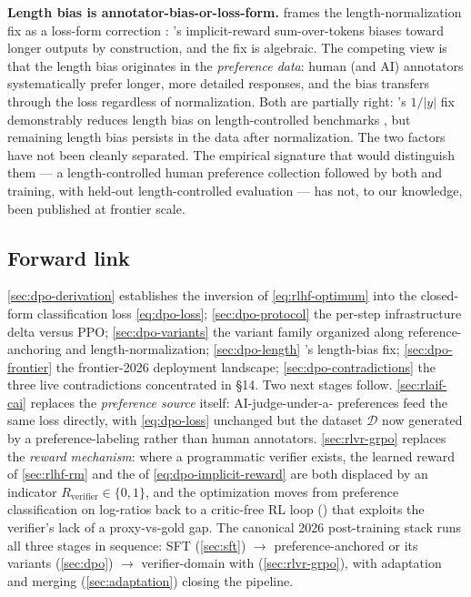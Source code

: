 \begin{contradiction}
\textbf{Length bias is annotator-bias-or-loss-form.}  frames the
length-normalization fix as a loss-form correction
\citep[\S 3]{meng2024-simpo}: 's implicit-reward sum-over-tokens
biases toward longer outputs by construction, and the fix is
algebraic. The competing view is that the length bias originates in
the \emph{preference data}: human (and AI) annotators systematically
prefer longer, more detailed responses, and the bias transfers
through the loss regardless of normalization. Both are partially
right: 's $1/|y|$ fix demonstrably reduces length bias on
length-controlled benchmarks \citep[\S 4]{meng2024-simpo}, but
remaining length bias persists in the data after normalization. The
two factors have not been cleanly separated. The empirical signature
that would distinguish them --- a length-controlled human preference
collection followed by both  and  training, with held-out
length-controlled evaluation --- has not, to our knowledge, been
published at frontier scale.
\end{contradiction}

\subsection{Forward link}
\label{sec:dpo-forward}

\cref{sec:dpo-derivation} establishes the inversion of
\cref{eq:rlhf-optimum} into the closed-form classification loss
\cref{eq:dpo-loss}; \cref{sec:dpo-protocol} the per-step
infrastructure delta versus PPO; \cref{sec:dpo-variants} the variant
family organized along reference-anchoring and length-normalization;
\cref{sec:dpo-length} 's length-bias fix; \cref{sec:dpo-frontier}
the frontier-2026 deployment landscape; \cref{sec:dpo-contradictions}
the three live contradictions concentrated in \S 14. Two next stages
follow. \cref{sec:rlaif-cai} replaces the \emph{preference source}
itself: AI-judge-under-a- preferences feed the same 
loss directly, with \cref{eq:dpo-loss} unchanged but the dataset
$\mathcal{D}$ now generated by a preference-labeling  rather than
human annotators. \cref{sec:rlvr-grpo} replaces the \emph{reward
mechanism}: where a programmatic verifier exists, the learned reward
of \cref{sec:rlhf-rm} and the  of
\cref{eq:dpo-implicit-reward} are both displaced by an indicator
$R_{\mathrm{verifier}} \in \{0, 1\}$, and the optimization moves from
preference classification on log-ratios back to a critic-free RL loop
() that exploits the verifier's lack of a proxy-vs-gold gap. The
canonical 2026 post-training stack runs all three stages in sequence:
SFT (\cref{sec:sft}) $\to$ preference-anchored  or its variants
(\cref{sec:dpo}) $\to$ verifier-domain  with 
(\cref{sec:rlvr-grpo}), with adaptation and merging
(\cref{sec:adaptation}) closing the pipeline.
